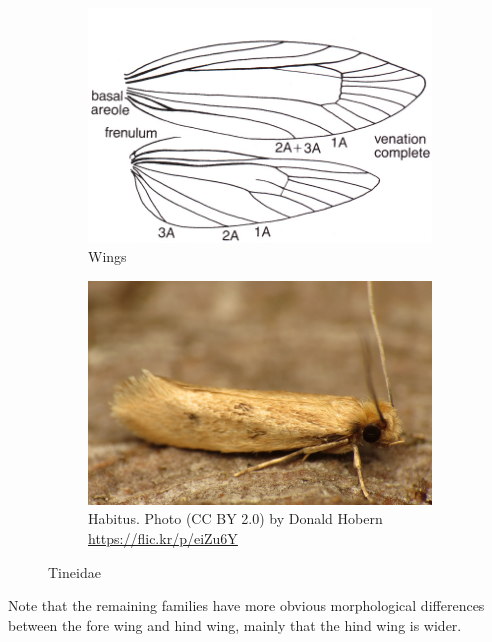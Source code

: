 \documentclass[letterpaper, 11pt]{article}
\begin{document}
\begin{figure}[ht!]
    \centering
    \begin{subfigure}[ht!]{0.45\textwidth}
        \includegraphics[width=\textwidth]{image34}
        \caption{Wings}
        \label{fig:tineid1}
    \end{subfigure}
    \qquad %
    \begin{subfigure}[ht!]{0.45\textwidth}
        \includegraphics[width=\textwidth]{tineid1}
        \caption{Habitus. Photo (CC BY 2.0) by Donald Hobern \url{https://flic.kr/p/eiZu6Y}}
        \label{fig:tineid2}
    \end{subfigure}
    \caption{Tineidae}\label{fig:tineids}
\end{figure}

Note that the remaining families have more obvious morphological differences between the fore wing and hind wing, mainly that the hind wing is wider.
\end{document}
